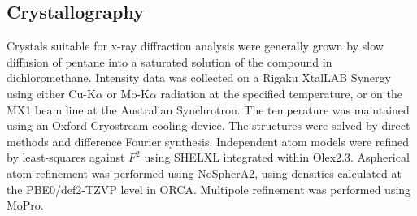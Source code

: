 \begin{refsection}
\subsection{Crystallography}
Crystals suitable for x-ray diffraction analysis were generally grown by slow diffusion of pentane into a saturated solution of the compound in dichloromethane.
Intensity data was collected on a Rigaku XtalLAB Synergy using either Cu-K$\alpha$ or Mo-K$\alpha$ radiation at the specified temperature, or on the MX1 beam line at the Australian Synchrotron\autocite{Cowieson2015}. 
The temperature was maintained using an Oxford Cryostream cooling device. 
The structures were solved by direct methods and difference Fourier synthesis.\autocite{Sheldrick2015}
Independent atom models were refined by least-squares against $F^{2}$ using SHELXL integrated within Olex2.3.\autocite{Sheldrick2008,Dolomanov2009}
Aspherical atom refinement was performed using NoSpherA2, using densities calculated at the PBE0/def2-TZVP level in ORCA.\autocite{Kleemiss2021,Neese2012}
Multipole refinement was performed using MoPro.\autocite{Jelsch2005}

\printbibliography[heading=subbibliography]
\end{refsection}
